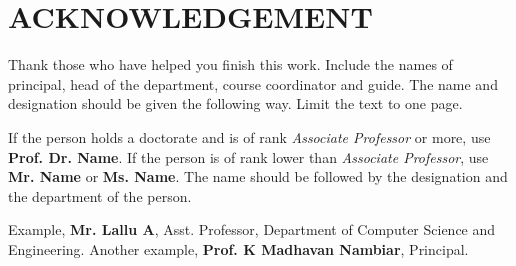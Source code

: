 \chapter*{\rm \large \bf ACKNOWLEDGEMENT}
\vspace{4.0mm}
\par Thank those who have helped you finish this work. Include the names of principal, head of the department, course coordinator and guide. The name and designation should be given the following way. Limit the text to one page.

\par If the person holds a doctorate and is of rank \emph{Associate Professor} or more, use \textbf{Prof. Dr. Name}. If the person is of rank lower than \emph{Associate Professor}, use \textbf{Mr. Name} or \textbf{Ms. Name}. The name should be followed by the designation and the department of the person.

\par Example, \textbf{Mr. Lallu A}, Asst. Professor, Department of Computer Science and Engineering. Another example, \textbf{Prof. K Madhavan Nambiar}, Principal.

\newpage
